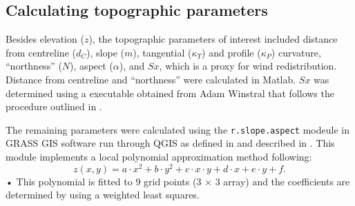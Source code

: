 \documentclass[12pt]{article}
\begin{document}
\subsection{Calculating topographic parameters}

Besides elevation ($z$), the topographic parameters of interest included distance from centreline ($d_C$), slope ($m$), tangential ($\kappa_T$) and profile ($\kappa_P$) curvature, ``northness'' ($N$), aspect ($\alpha$), and $Sx$, which is a proxy for wind redistribution. Distance from centreline and ``northness'' were calculated in Matlab. $Sx$ was determined using a executable obtained from Adam Winstral that follows the procedure outlined in \cite{Winstral2002}. 

The remaining parameters were calculated using the \texttt{r.slope.aspect} modeule in GRASS GIS software run through QGIS as defined in \cite{Mitavsova1993} and described in \cite{Hofierka2009}. This module implements a local polynomial approximation method following:
\begin{equation}
z(x,y) = a\cdot x^2 +b\cdot y^2 +c \cdot x\cdot y +d \cdot x + e\cdot y +f.
\end{equation}•
This polynomial is fitted to 9 grid points (3 $\times$ 3 array) and the coefficients are determined by using a weighted least squares. 
\end{document}
